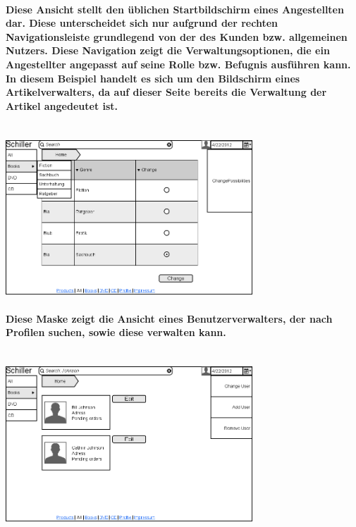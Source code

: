 \documentclass[a4paper]{article}
\begin{document}
\paragraph{Diese Ansicht stellt den üblichen Startbildschirm eines Angestellten dar. Diese unterscheidet sich nur aufgrund der rechten Navigationsleiste grundlegend von der des Kunden bzw. allgemeinen Nutzers. Diese Navigation zeigt die Verwaltungsoptionen, die ein Angestellter angepasst auf seine Rolle bzw. Befugnis ausführen kann.\\
In diesem Beispiel handelt es sich um den Bildschirm eines Artikelverwalters, da auf dieser Seite bereits die Verwaltung der Artikel angedeutet ist.\\ \\}
\includegraphics[width=350px]{14Home_Employee.png}

\paragraph{Diese Maske zeigt die Ansicht eines Benutzerverwalters, der nach Profilen suchen, sowie diese verwalten kann.\\ \\}
\includegraphics[width=350px]{15ChangeUser.png}
\end{document}
